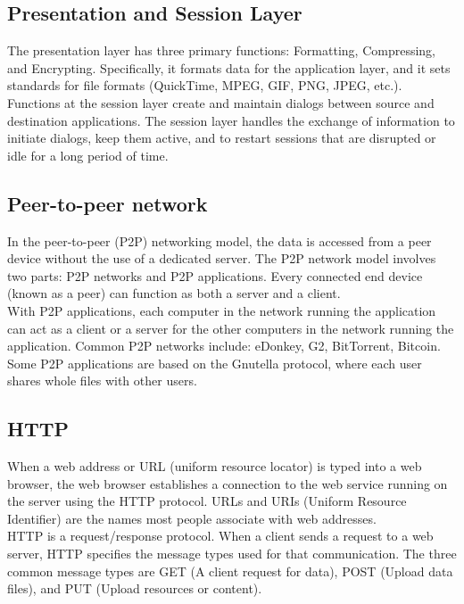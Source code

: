 \subsection{Presentation and Session Layer}

The presentation layer has three primary functions: Formatting, Compressing, and Encrypting. Specifically, it formats data for the application layer, and it sets standards for file formats (QuickTime, MPEG, GIF, PNG, JPEG, etc.).\\

Functions at the session layer create and maintain dialogs between source and destination applications. The session layer handles the exchange of information to initiate dialogs, keep them active, and to restart sessions that are disrupted or idle for a long period of time.\\

\subsection{Peer-to-peer network}

In the peer-to-peer (P2P) networking model, the data is accessed from a peer device without the use of a dedicated server. The P2P network model involves two parts: P2P networks and P2P applications. Every connected end device (known as a peer) can function as both a server and a client. \\

With P2P applications, each computer in the network running the application can act as a client or a server for the other computers in the network running the application. Common P2P networks include: eDonkey, G2, BitTorrent, Bitcoin. Some P2P applications are based on the Gnutella protocol, where each user shares whole files with other users. 

\subsection{HTTP}

When a web address or URL (uniform resource locator) is typed into a web browser, the web browser establishes a connection to the web service running on the server using the HTTP protocol. URLs and URIs (Uniform Resource Identifier) are the names most people associate with web addresses.\\

HTTP is a request/response protocol. When a client sends a request to a web server, HTTP specifies the message types used for that communication. The three common message types are GET (A client request for data), POST (Upload data files), and PUT (Upload resources or content).\\

